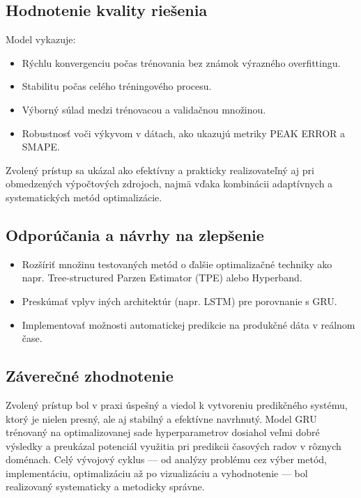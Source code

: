 \subsection{Hodnotenie kvality riešenia}

Model vykazuje:

\begin{itemize}
\item Rýchlu konvergenciu počas trénovania bez známok výrazného overfittingu.
\item Stabilitu počas celého tréningového procesu.
\item Výborný súlad medzi trénovacou a validačnou množinou.
\item Robustnosť voči výkyvom v dátach, ako ukazujú metriky PEAK ERROR a SMAPE.
\end{itemize}

Zvolený prístup sa ukázal ako efektívny a prakticky realizovateľný aj pri obmedzených výpočtových zdrojoch, najmä vďaka kombinácii adaptívnych a systematických metód optimalizácie.

\subsection{Odporúčania a návrhy na zlepšenie}

\begin{itemize}
\item Rozšíriť množinu testovaných metód o ďalšie optimalizačné techniky ako napr. Tree-structured Parzen Estimator (TPE) alebo Hyperband.
\item Preskúmať vplyv iných architektúr (napr. LSTM) pre porovnanie s GRU.
\item Implementovať možnosti automatickej predikcie na produkčné dáta v reálnom čase.
\end{itemize}

\subsection{Záverečné zhodnotenie}

Zvolený prístup bol v praxi úspešný a viedol k vytvoreniu predikčného systému, ktorý je nielen presný, ale aj stabilný a efektívne navrhnutý. Model GRU trénovaný na optimalizovanej sade hyperparametrov dosiahol veľmi dobré výsledky a preukázal potenciál využitia pri predikcii časových radov v rôznych doménach. Celý vývojový cyklus — od analýzy problému cez výber metód, implementáciu, optimalizáciu až po vizualizáciu a vyhodnotenie — bol realizovaný systematicky a metodicky správne.
